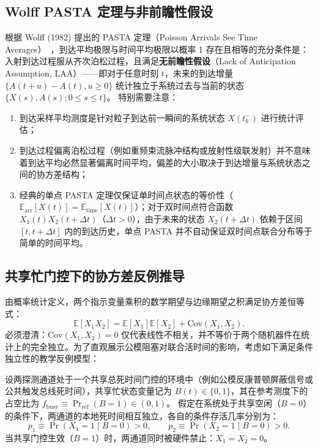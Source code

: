\subsection{Wolff PASTA 定理与非前瞻性假设}

根据 Wolff (1982) 提出的 PASTA 定理（Poisson Arrivals See Time Averages）~\cite{wolff-1982-poisson-arrivals-see-time-averages}，到达平均极限与时间平均极限以概率 1 存在且相等的充分条件是：入射到达过程服从齐次泊松过程，且满足\textbf{无前瞻性假设}（Lack of Anticipation Assumption, LAA）——即对于任意时刻 $t$，未来的到达增量 $\{A(t+u) - A(t), u \ge 0\}$ 统计独立于系统过去与当前的状态 $\{X(s), A(s); 0 \le s \le t\}$。
特别需要注意：
\begin{enumerate}
\item 到达采样平均测度是针对粒子到达前一瞬间的系统状态 $X(t_k^-)$ 进行统计评估；
\item 到达过程偏离泊松过程（例如重频束流脉冲结构或放射性级联发射）并不意味着到达平均必然显著偏离时间平均，偏差的大小取决于到达增量与系统状态之间的协方差结构；
\item 经典的单点 PASTA 定理仅保证单时间点状态的等价性（$\mathbb{E}_{\mathrm{arr}}[X(t)] = \mathbb{E}_{\mathrm{time}}[X(t)]$）；对于双时间点符合函数 $X_1(t) X_2(t+\Delta t)$（$\Delta t > 0$），由于未来的状态 $X_2(t+\Delta t)$ 依赖于区间 $[t, t+\Delta t]$ 内的到达历史，单点 PASTA 并不自动保证双时间点联合分布等于简单的时间平均。
\end{enumerate}

\subsection{共享忙门控下的协方差反例推导}

由概率统计定义，两个指示变量乘积的数学期望与边缘期望之积满足协方差恒等式：
\begin{equation}\label{eq:appE-cov-identity}
\mathbb{E}[X_1 X_2] = \mathbb{E}[X_1] \mathbb{E}[X_2] + \mathrm{Cov}(X_1, X_2).
\end{equation}
必须澄清：$\mathrm{Cov}(X_1, X_2) = 0$ 仅代表线性不相关，并不等价于两个随机器件在统计上的完全独立。为了直观展示公模阻塞对联合活时间的影响，考虑如下满足条件独立性的教学反例模型：

设两探测通道处于一个共享总死时间门控的环境中（例如公模反康普顿屏蔽信号或公共触发总线死时间），共享忙状态变量记为 $B(t) \in \{0, 1\}$，其在参考测度下的占空比为 $f_{\mathrm{busy}} \equiv \Pr_{\mathrm{ref}}(B = 1) \in (0, 1)$。
假定在系统处于共享空闲（$B = 0$）的条件下，两通道的本地死时间相互独立，各自的条件存活几率分别为：
\begin{equation}\label{eq:appE-cond-prob}
p_1 \equiv \Pr(X_1 = 1 \mid B = 0) > 0, \qquad p_2 \equiv \Pr(X_2 = 1 \mid B = 0) > 0.
\end{equation}
当共享门控生效（$B = 1$）时，两通道同时被硬件禁止：$X_1 = X_2 = 0$。

